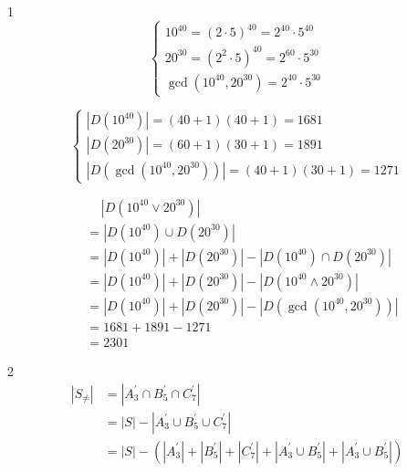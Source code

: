 \documentclass[a4paper]{article}
\begin{document}
{\large1}
\[\begin{cases}
	10^{40}=(2\cdot5)^{40}=2^{40}\cdot5^{40}\\
	20^{30}=(2^2\cdot5)^{40}=2^{60}\cdot5^{30}\\
	\gcd\left(10^{40},20^{30}\right)=2^{40}\cdot5^{30}
\end{cases}\]

\[\begin{cases}
	\left|D\left(10^{40}\right)\right|=(40+1)(40+1)=1681\\
	\left|D\left(20^{30}\right)\right|=(60+1)(30+1)=1891\\
	\left|D\left(\gcd\left(10^{40},20^{30}\right)\right)\right|=(40+1)(30+1)=1271
\end{cases}\]

\[\begin{aligned}
	&\quad\,\left|D\left(10^{40}\lor20^{30}\right)\right|\\
	&=\left|D\left(10^{40}\right)\cup D\left(20^{30}\right)\right|\\
	&=\left|D\left(10^{40}\right)\right|+\left|D\left(20^{30}\right)\right|-\left|D\left(10^{40}\right)\cap D\left(20^{30}\right)\right|\\
	&=\left|D\left(10^{40}\right)\right|+\left|D\left(20^{30}\right)\right|-\left|D\left(10^{40}\land20^{30}\right)\right|\\
	&=\left|D\left(10^{40}\right)\right|+\left|D\left(20^{30}\right)\right|-\left|D\left(\gcd\left(10^{40},20^{30}\right)\right)\right|\\
	&=1681+1891-1271\\
	&=\boxed{2301}
\end{aligned}\]

{\large2}
\[\begin{aligned}
	|S_{\ne}|&=\left|A_3^\prime\cap B_5^\prime\cap C_7^\prime\right|\\
		 &=|S|-\left|A_3^\prime\cup B_5^\prime\cup C_7^\prime\right|\\
		 &=|S|-\left(\left|A_3^\prime\right|+\left|B_5^\prime\right|+\left|C_7^\prime\right|+\left|A_3^\prime\cup B_5^\prime\right|+\left|A_3^\prime\cup B_5^\prime\right|\right)\\
\end{aligned}\]
\end{document}
